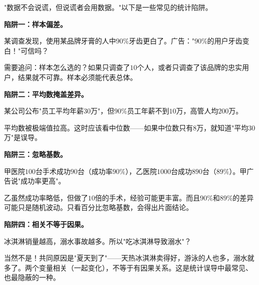 "数据不会说谎，但说谎者会用数据。"以下是一些常见的统计陷阱。

\textbf{陷阱一：样本偏差。}

\begin{example}
某调查发现，使用某品牌牙膏的人中$90\%$牙齿更白了。广告："$90\%$的用户牙齿变白！"可信吗？
\end{example}
\begin{solution}
需要追问：样本怎么选的？如果只调查了$10$个人，或者只调查了该品牌的忠实用户，结果就不可靠。样本必须能代表总体。
\end{solution}

\textbf{陷阱二：平均数掩盖差异。}

\begin{example}
某公司公布"员工平均年薪$30$万"，但$90\%$员工年薪不到$10$万，高管人均$200$万。
\end{example}
\begin{solution}
平均数被极端值拉高。这时应该看中位数——如果中位数只有$8$万，就知道"平均$30$万"是误导。
\end{solution}

\textbf{陷阱三：忽略基数。}

\begin{example}
甲医院$100$台手术成功$90$台（成功率$90\%$），乙医院$1000$台成功$890$台（$89\%$）。甲广告说"成功率更高"。
\end{example}
\begin{solution}
乙虽然成功率略低，但做了$10$倍的手术，经验可能更丰富。而且$90\%$和$89\%$的差异可能只是随机波动。只看百分比忽略基数，会得出片面结论。
\end{solution}

\textbf{陷阱四：相关不等于因果。}

\begin{example}
冰淇淋销量越高，溺水事故越多。所以"吃冰淇淋导致溺水"？
\end{example}
\begin{solution}
当然不是！共同原因是"夏天到了"——天热冰淇淋卖得好，游泳的人也多，溺水就多了。两个变量相关（一起变化），不等于有因果关系。这是统计误导中最常见、也最隐蔽的一种。
\end{solution}


